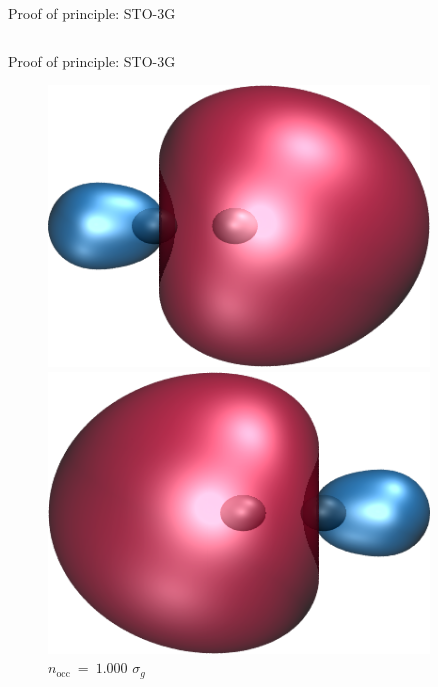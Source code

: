 \documentclass[10pt]{beamer}
\begin{document}
\begin{frame}{Proof of principle:  STO-3G}
\begin{figure}
\begin{columns}
    \end{columns}

  \end{figure}
  
\end{frame}

\begin{frame}{Proof of principle:  STO-3G}

  \begin{figure}
    \centering

    \begin{columns}

      \begin{column}{0.15\textwidth}
        
        \includegraphics[width=0.9\textwidth]{Figures/H2_SB1_mo1.cube.png}
        \caption*{\centering $n_\text{occ}~=~1.000$
        $\sigma_u$}
        \includegraphics[width=0.9\textwidth]{Figures/H2_SB1_mo2.cube.png}
        \caption*{\centering $n_\text{occ}~=~1.000$
        $\sigma_g$}
      \end{column}


\end{columns}
\end{figure}
\end{frame}
\end{document}
